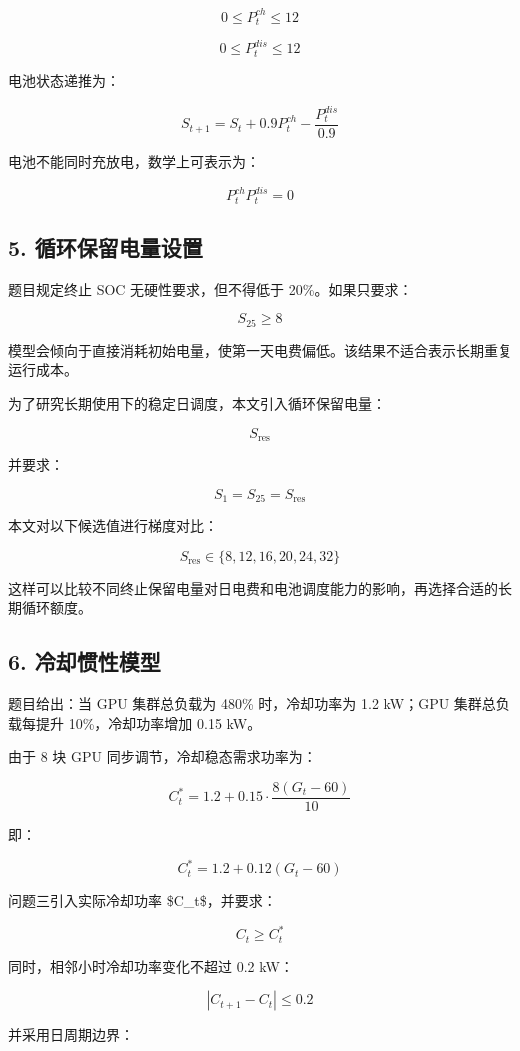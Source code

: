 \documentclass[
]{article}
\begin{document}
\[0\le P_t^{ch}\le 12\]

\[0\le P_t^{dis}\le 12\]

电池状态递推为：

\[S_{t+1}=S_t+0.9P_t^{ch}-\frac{P_t^{dis}}{0.9}\]

电池不能同时充放电，数学上可表示为：

\[P_t^{ch}P_t^{dis}=0\]

\subsection{5.
循环保留电量设置}\label{5-ux5faaux73afux4fddux7559ux7535ux91cfux8bbeux7f6e}

题目规定终止 SOC 无硬性要求，但不得低于 20\%。如果只要求：

\[S_{25}\ge 8\]

模型会倾向于直接消耗初始电量，使第一天电费偏低。该结果不适合表示长期重复运行成本。

为了研究长期使用下的稳定日调度，本文引入循环保留电量：

\[S_{\text{res}}\]

并要求：

\[S_1=S_{25}=S_{\text{res}}\]

本文对以下候选值进行梯度对比：

\[S_{\text{res}}\in\{8,12,16,20,24,32\}\]

这样可以比较不同终止保留电量对日电费和电池调度能力的影响，再选择合适的长期循环额度。

\subsection{6.
冷却惯性模型}\label{6-ux51b7ux5374ux60efux6027ux6a21ux578b}

题目给出：当 GPU 集群总负载为 480\% 时，冷却功率为 1.2 kW；GPU
集群总负载每提升 10\%，冷却功率增加 0.15 kW。

由于 8 块 GPU 同步调节，冷却稳态需求功率为：

\[C_t^*=1.2+0.15\cdot\frac{8(G_t-60)}{10}\]

即：

\[C_t^*=1.2+0.12(G_t-60)\]

问题三引入实际冷却功率 \$C\_t\$，并要求：

\[C_t\ge C_t^*\]

同时，相邻小时冷却功率变化不超过 0.2 kW：

\[|C_{t+1}-C_t|\le 0.2\]

并采用日周期边界：
\end{document}
